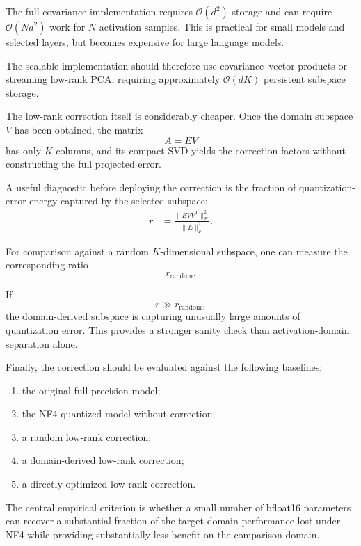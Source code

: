 \documentclass[11pt,a4paper]{article}
\begin{document}
The full covariance implementation requires
$\mathcal{O}(d^2)$ storage and can require $\mathcal{O}(Nd^2)$ work for
$N$ activation samples. This is practical for small models and
selected layers, but becomes expensive for large language models.

The scalable implementation should therefore use covariance--vector
products or streaming low-rank PCA, requiring approximately
$\mathcal{O}(dK)$ persistent subspace storage.

The low-rank correction itself is considerably cheaper. Once the
domain subspace $V$ has been obtained, the matrix
\[
A=EV
\]
has only $K$ columns, and its compact SVD yields the correction factors
without constructing the full projected error.

A useful diagnostic before deploying the correction is the fraction of
quantization-error energy captured by the selected subspace:
\begin{align}
r
&=
\frac{
\|EVV^{\mathsf T}\|_F^2
}{
\|E\|_F^2
}.
\end{align}

For comparison against a random $K$-dimensional subspace, one can
measure the corresponding ratio
\[
r_{\mathrm{random}}.
\]

If
\[
r\gg r_{\mathrm{random}},
\]
the domain-derived subspace is capturing unusually large amounts of
quantization error. This provides a stronger sanity check than
activation-domain separation alone.

Finally, the correction should be evaluated against the following
baselines:
\begin{enumerate}
  \item the original full-precision model;
  \item the NF4-quantized model without correction;
  \item a random low-rank correction;
  \item a domain-derived low-rank correction;
  \item a directly optimized low-rank correction.
\end{enumerate}

The central empirical criterion is whether a small number of bfloat16
parameters can recover a substantial fraction of the target-domain
performance lost under NF4 while providing substantially less benefit
on the comparison domain.
\end{document}
